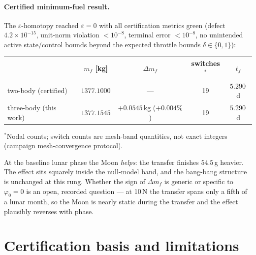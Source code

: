 \documentclass[11pt]{article}
\begin{document}
\paragraph{Certified minimum-fuel result.}
The $\varepsilon$-homotopy reached $\varepsilon = 0$ with all
certification metrics green (defect $4.2\times 10^{-15}$, unit-norm
violation $<10^{-8}$, terminal error $<10^{-8}$, no unintended active
state/control bounds beyond the expected throttle bounds
$\delta \in \{0,1\}$):
\begin{center}
\begin{tabular}{lcccc}
\toprule
 & $m_f$ [kg] & $\Delta m_f$ & switches$^{\ast}$ & $t_f$\\
\midrule
two-body (certified)   & $1377.1000$ & ---        & 19 & $5.290$\,d\\
three-body (this work) & $1377.1545$ & $+0.0545$\,kg ($+0.004\%$) & 19 & $5.290$\,d\\
\bottomrule
\end{tabular}
\end{center}
{\footnotesize $^{\ast}$Nodal counts; switch counts are mesh-band
quantities, not exact integers (campaign mesh-convergence protocol).}

\medskip
At the baseline lunar phase the Moon \emph{helps}: the transfer finishes
$54.5$\,g heavier. The effect sits squarely inside the null-model band,
and the bang-bang structure is unchanged at this rung. Whether the sign of
$\Delta m_f$ is generic or specific to $\varphi_0 = 0$ is an open,
recorded question --- at 10\,N the transfer spans only a fifth of a lunar
month, so the Moon is nearly static during the transfer and the effect
plausibly reverses with phase.

\section{Certification basis and limitations}
\label{sec:certification}
\end{document}
